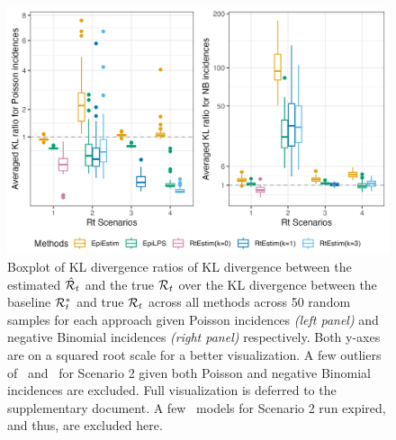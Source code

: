 \begin{figure}[htb]
    \centering
    \includegraphics[width=.99\textwidth]{fig/kl.png}
    \caption{Boxplot of KL divergence ratios of KL divergence between the estimated 
    $\hat{\mathcal{R}}_t$ and the true $\mathcal{R}_t$ over the KL divergence between the 
    baseline $\mathcal{R}^{\ast}_t$ and true $\mathcal{R}_t$ across all methods across 50 random samples for 
    each approach given Poisson incidences \textit{(left panel)} and negative 
    Binomial incidences \textit{(right panel)} respectively. 
    Both y-axes are on a squared root scale for a better visualization. 
    A few outliers of \EpiEstim\ and \EpiLPS\ for Scenario 2 given both Poisson 
    and negative Binomial incidences are excluded. Full visualization is deferred 
    to the supplementary document. 
    A few \RtEstim\ models for Scenario 2 run expired, and thus, are excluded here.} 
    \label{fig:kl-res}
\end{figure}




